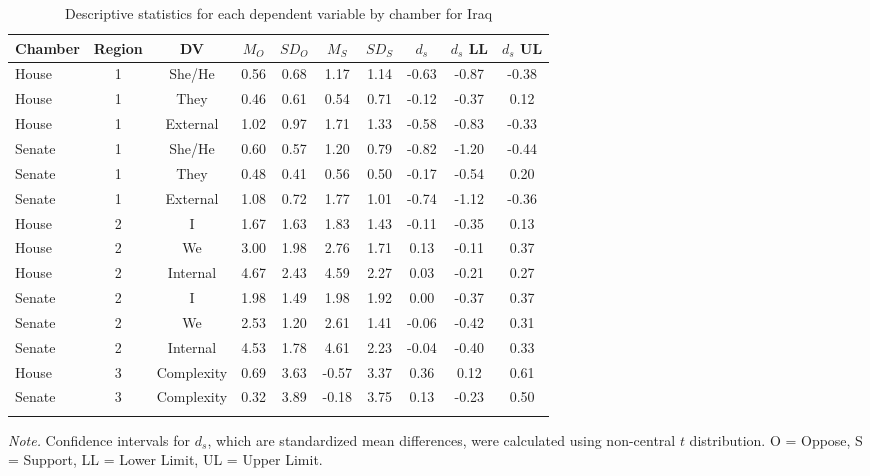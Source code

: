 \documentclass[jou,a4paper]{apa6}
\begin{document}
\begin{table}[htbp]

\begin{center}
\begin{threeparttable}

\caption{\label{tab:Itable}Descriptive statistics for each dependent variable by chamber for Iraq}

\small{

\begin{tabular}{lccccccccc}
\toprule
Chamber & Region & DV & $M_O$ & $SD_O$ & $M_S$ & $SD_S$ & $d_s$ & $d_s$ LL & $d_s$ UL\\
\midrule
House & 1 & She/He & 0.56 & 0.68 & 1.17 & 1.14 & -0.63 & -0.87 & -0.38\\
House & 1 & They & 0.46 & 0.61 & 0.54 & 0.71 & -0.12 & -0.37 & 0.12\\
House & 1 & External & 1.02 & 0.97 & 1.71 & 1.33 & -0.58 & -0.83 & -0.33\\
Senate & 1 & She/He & 0.60 & 0.57 & 1.20 & 0.79 & -0.82 & -1.20 & -0.44\\
Senate & 1 & They & 0.48 & 0.41 & 0.56 & 0.50 & -0.17 & -0.54 & 0.20\\
Senate & 1 & External & 1.08 & 0.72 & 1.77 & 1.01 & -0.74 & -1.12 & -0.36\\
House & 2 & I & 1.67 & 1.63 & 1.83 & 1.43 & -0.11 & -0.35 & 0.13\\
House & 2 & We & 3.00 & 1.98 & 2.76 & 1.71 & 0.13 & -0.11 & 0.37\\
House & 2 & Internal & 4.67 & 2.43 & 4.59 & 2.27 & 0.03 & -0.21 & 0.27\\
Senate & 2 & I & 1.98 & 1.49 & 1.98 & 1.92 & 0.00 & -0.37 & 0.37\\
Senate & 2 & We & 2.53 & 1.20 & 2.61 & 1.41 & -0.06 & -0.42 & 0.31\\
Senate & 2 & Internal & 4.53 & 1.78 & 4.61 & 2.23 & -0.04 & -0.40 & 0.33\\
House & 3 & Complexity & 0.69 & 3.63 & -0.57 & 3.37 & 0.36 & 0.12 & 0.61\\
Senate & 3 & Complexity & 0.32 & 3.89 & -0.18 & 3.75 & 0.13 & -0.23 & 0.50\\
\bottomrule
\addlinespace
\end{tabular}

}

\begin{tablenotes}[para]
\normalsize{\textit{Note.} Confidence intervals for $d_s$, which are standardized mean differences, were calculated using 
          non-central $t$ distribution. O = Oppose, S = Support, LL = Lower Limit, UL = Upper Limit.}
\end{tablenotes}

\end{threeparttable}
\end{center}

\end{table}
\end{document}
